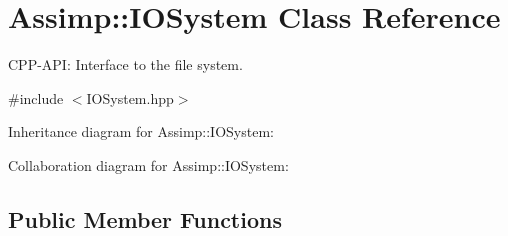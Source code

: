 \hypertarget{class_assimp_1_1_i_o_system}{\section{Assimp\+:\+:I\+O\+System Class Reference}
\label{class_assimp_1_1_i_o_system}
}


C\+P\+P-\/\+A\+P\+I\+: Interface to the file system.  




{\ttfamily \#include $<$I\+O\+System.\+hpp$>$}



Inheritance diagram for Assimp\+:\+:I\+O\+System\+:


Collaboration diagram for Assimp\+:\+:I\+O\+System\+:
\subsection*{Public Member Functions}
